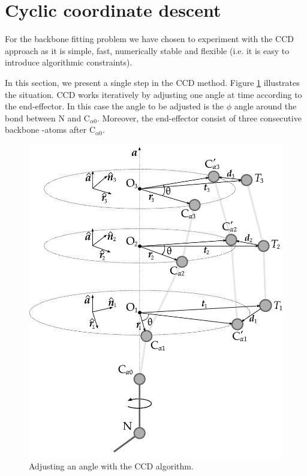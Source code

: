 \section{Cyclic coordinate descent}
For the backbone fitting problem we have chosen to experiment with the CCD approach as it is simple, fast, numerically stable and flexible (i.e. it is easy to introduce algorithmic constraints).

In this section, we present a single step in the CCD method.
Figure \ref{fig:ccd} illustrates the situation.
CCD works iteratively by adjusting one angle at time according to the end-effector.
In this case the angle to be adjusted is the $\phi$ angle around the bond between N and C$_{\alpha0}$. Moreover, the end-effector consist of three consecutive backbone \Ca-atoms after C$_{\alpha0}$.

\begin{figure}
  \centering
	\includegraphics[width=0.98\columnwidth]{figures/ccd}
  \caption{Adjusting an angle with the CCD algorithm.}
  \label{fig:ccd}
\end{figure}


